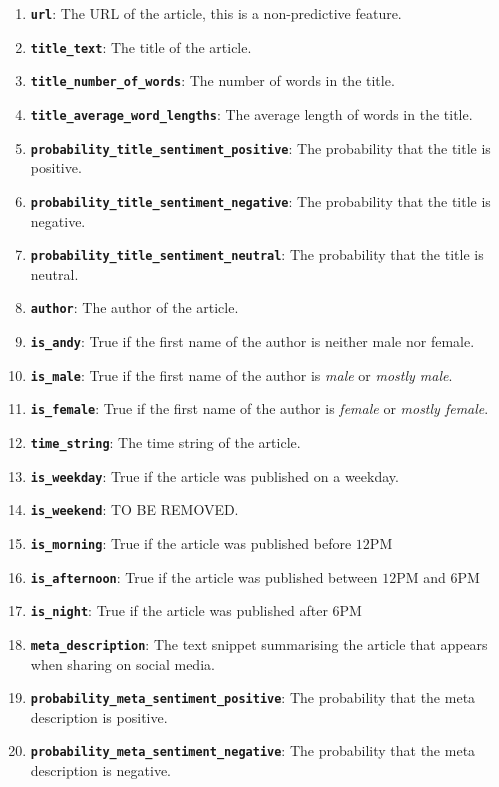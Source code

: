 \documentclass{article}
\begin{document}
\begin{enumerate}
\item \texttt{\textbf{url}}: The URL of the article, this is a non-predictive feature.
\item \texttt{\textbf{title\_text}}: The title of the article.
\item \texttt{\textbf{title\_number\_of\_words}}: The number of words in the title.
\item \texttt{\textbf{title\_average\_word\_lengths}}: The average length of words in the title.
\item \texttt{\textbf{probability\_title\_sentiment\_positive}}: The probability that the title is positive.
\item \texttt{\textbf{probability\_title\_sentiment\_negative}}: The probability that the title is negative.
\item \texttt{\textbf{probability\_title\_sentiment\_neutral}}: The probability that the title is neutral.
\item \texttt{\textbf{author}}: The author of the article.
\item \texttt{\textbf{is\_andy}}: True if the first name of the author is neither male nor female.
\item \texttt{\textbf{is\_male}}: True if the first name of the author is \emph{male} or \emph{mostly male}.
\item \texttt{\textbf{is\_female}}: True if the first name of the author is \emph{female} or \emph{mostly female}.
\item \texttt{\textbf{time\_string}}: The time string of the article.
\item \texttt{\textbf{is\_weekday}}: True if the article was published on a weekday.
\item \texttt{\textbf{is\_weekend}}: TO BE REMOVED.
\item \texttt{\textbf{is\_morning}}: True if the article was published before $12$PM
\item \texttt{\textbf{is\_afternoon}}: True if the article was published between $12$PM and $6$PM
\item \texttt{\textbf{is\_night}}: True if the article was published after $6$PM
\item \texttt{\textbf{meta\_description}}: The text snippet summarising the article that appears when sharing on social media.
\item \texttt{\textbf{probability\_meta\_sentiment\_positive}}: The probability that the meta description is positive.
\item \texttt{\textbf{probability\_meta\_sentiment\_negative}}: The probability that the meta description is negative.

\end{enumerate}
\end{document}
